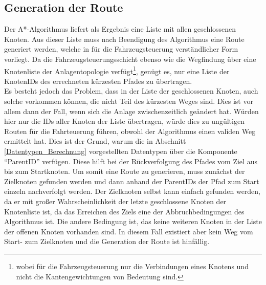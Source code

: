 		\subsection{Generation der Route}
			\label{Routengeneration}
			Der A*-Algorithmus liefert als Ergebnis eine Liste mit allen geschlossenen Knoten. Aus dieser Liste muss nach Beendigung des Algorithmus eine Route generiert werden, welche in für die Fahrzeugsteuerung verständlicher Form vorliegt. Da die Fahrzeugsteuerungsschicht ebenso wie die Wegfindung über eine Knotenliste der Anlagentopologie verfügt\footnote{wobei für die Fahrzeugsteuerung nur die Verbindungen eines Knotens und nicht die Kantengewichtungen von  Bedeutung sind.}, genügt es, nur eine Liste der KnotenIDs des errechneten kürzesten Pfades zu übertragen.
			\\[4pt]
			Es besteht jedoch das Problem, dass in der Liste der geschlossenen Knoten, auch solche vorkommen können, die nicht Teil des kürzesten Weges sind. Dies ist vor allem dann der Fall, wenn sich die Anlage zwischenzeitlich geändert hat. Würden hier nur die IDs aller Knoten der Liste übertragen, würde dies zu ungültigen Routen für die Fahrteuerung führen, obwohl der Algorithmus einen validen Weg ermittelt hat. Dies ist der Grund, warum die in Abschnitt \ref{Datentypen_Berechnung} vorgestellten Datentypen über die Komponente "`ParentID"' verfügen. Diese hilft bei der Rückverfolgung  des Pfades vom Ziel aus bis zum Startknoten. Um somit eine Route zu generieren, muss zunächst der Zielknoten gefunden werden und dann anhand der ParentIDs der Pfad zum Start einzeln nachverfolgt werden. Der Zielknoten selbst kann einfach gefunden werden, da er mit großer Wahrscheinlichkeit der letzte geschlossene Knoten der Knotenliste ist, da das Erreichen des Ziels eine der Abbruchbedingungen des Algorithmus ist. Die andere Bedingung ist, das keine weiteren Knoten in der Liste der offenen Knoten vorhanden sind. In diesem Fall existiert aber kein Weg vom Start- zum Zielknoten und die Generation der Route ist hinfällig.
			\\[4pt]
